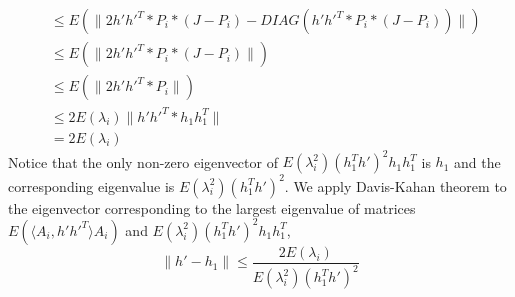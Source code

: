 \documentclass[10pt,journal,compsoc]{IEEEtran}
\newenvironment{proof}[1][Proof]{\begin{trivlist}
		\item[\hskip \labelsep {\bfseries #1}]}{\end{trivlist}}
\begin{document}
\begin{proof} [Proof of Theorem 4.2]
\begin{align*}
	&\leq  E(\|2 h' h'^T *P_i*(J-P_i) - DIAG(h' h'^T*P_i*(J-P_i))\|) \\
	&\leq  E(\|2 h' h'^T *P_i*(J-P_i)\|) \\
	&\leq  E(\|2 h' h'^T * P_i\|) \\
	&\leq  2 E(\lambda_i)\| h' h'^T * h_1 h_1^T\| \\
	&=  2 E(\lambda_i) 
	\end{align*}
	Notice that the only non-zero eigenvector of $E(\lambda_i^2) (h_1^Th')^2 h_1 h_1^T$ is $h_1$ and the corresponding eigenvalue is $E(\lambda_i^2) (h_1^Th')^2$. We apply Davis-Kahan theorem \cite{davis1970rotation} to the eigenvector corresponding to the largest eigenvalue of matrices $E(\langle A_{i},h' h'^T \rangle A_{i} )$ and $E(\lambda_i^2) (h_1^Th')^2 h_1 h_1^T$,
	\[\|h'-h_1\| \leq \frac{2 E(\lambda_i)}{E(\lambda_i^2)(h_1^T h')^2} \]
\end{proof}




%
%
%





% 



\end{document}
